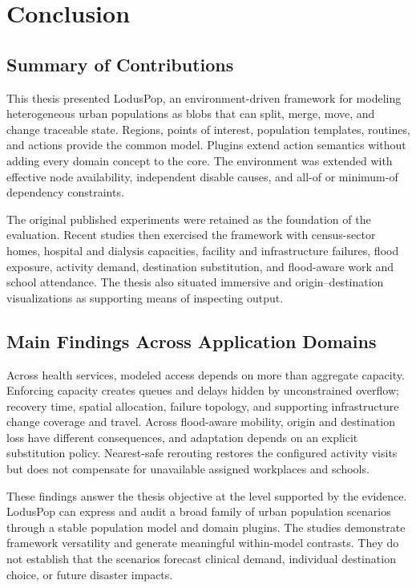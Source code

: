 \documentclass[pdflatex,sn-mathphys-num]{sn-jnl}%
\theoremstyle{thmstyleone}%
\theoremstyle{thmstyletwo}%
\theoremstyle{thmstylethree}%
\begin{document}
\section{Conclusion}
\label{sec:conclusion}
\subsection{Summary of Contributions}

This thesis presented LodusPop, an environment-driven framework for modeling heterogeneous urban populations as blobs that can split, merge, move, and change traceable state. Regions, points of interest, population templates, routines, and actions provide the common model. Plugins extend action semantics without adding every domain concept to the core. The environment was extended with effective node availability, independent disable causes, and all-of or minimum-of dependency constraints.

The original published experiments were retained as the foundation of the evaluation. Recent studies then exercised the framework with census-sector homes, hospital and dialysis capacities, facility and infrastructure failures, flood exposure, activity demand, destination substitution, and flood-aware work and school attendance. The thesis also situated immersive and origin--destination visualizations as supporting means of inspecting output.

\subsection{Main Findings Across Application Domains}

Across health services, modeled access depends on more than aggregate capacity. Enforcing capacity creates queues and delays hidden by unconstrained overflow; recovery time, spatial allocation, failure topology, and supporting infrastructure change coverage and travel. Across flood-aware mobility, origin and destination loss have different consequences, and adaptation depends on an explicit substitution policy. Nearest-safe rerouting restores the configured activity visits but does not compensate for unavailable assigned workplaces and schools.

These findings answer the thesis objective at the level supported by the evidence. LodusPop can express and audit a broad family of urban population scenarios through a stable population model and domain plugins. The studies demonstrate framework versatility and generate meaningful within-model contrasts. They do not establish that the scenarios forecast clinical demand, individual destination choice, or future disaster impacts.
\end{document}
